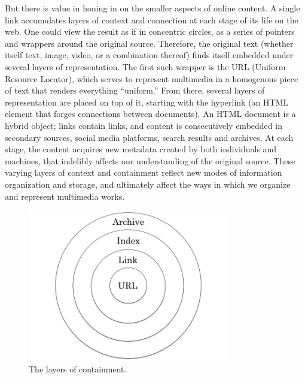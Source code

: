 But there is value in honing in on the smaller aspects of online content. A single link accumulates layers of context and connection at each stage of its life on the web. One could view the result as if in concentric circles, as a series of pointers and wrappers around the original source. Therefore, the original text (whether itself text, image, video, or a combination thereof) finds itself embedded under several layers of representation. The first such wrapper is the URL (Uniform Resource Locator), which serves to represent multimedia in a homogenous piece of text that renders everything ``uniform.'' From there, several layers of representation are placed on top of it, starting with the hyperlink (an HTML element that forges connections between documents). An HTML document is a hybrid object; links contain links, and content is consecutively embedded in secondary sources, social media platforms, search results and archives. At each stage, the content acquires new metadata created by both individuals and machines, that indelibly affects our understanding of the original source. These varying layers of context and containment reflect new modes of information organization and storage, and ultimately affect the ways in which we organize and represent multimedia works.

\begin{figure}[ht]
\centering
\includegraphics[width=250pt]{figures/layersofcontainment}
\caption{The layers of containment.}
\label{fig:layersofcontainment}
\end{figure}

